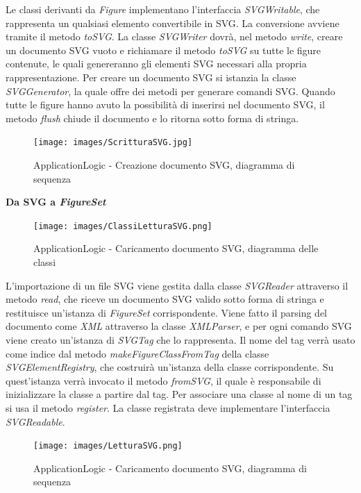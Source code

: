 Le classi derivanti da \textit{Figure} implementano l'interfaccia \textit{SVGWritable}, che rappresenta un qualsiasi elemento convertibile in SVG. La conversione avviene tramite il metodo \textit{toSVG}. La classe \textit{SVGWriter} dovr\`a, nel metodo \textit{write}, creare un documento SVG vuoto e richiamare il metodo \textit{toSVG} su tutte le figure contenute, le quali genereranno gli elementi SVG necessari alla propria rappresentazione. Per creare un documento SVG si istanzia la classe \textit{SVGGenerator}, la quale offre dei metodi per generare comandi SVG. Quando tutte le figure hanno avuto la possibilit\`a di inserirsi nel documento SVG, il metodo \textit{flush} chiude il documento e lo ritorna sotto forma di stringa.
\newpage
\begin{figure}[!ht]
\centering
\texttt{[image: images/ScritturaSVG.jpg]}
\caption{ApplicationLogic - Creazione documento SVG, diagramma di sequenza}
\end{figure}

\newpage
\textbf{Da SVG a \textit{FigureSet}}

\begin{figure}[!ht]
\centering
\texttt{[image: images/ClassiLetturaSVG.png]}
\caption{ApplicationLogic - Caricamento documento SVG, diagramma delle classi}
\end{figure}

L'importazione di un file SVG viene gestita dalla classe \textit{SVGReader} attraverso il metodo \textit{read}, che riceve un documento SVG valido sotto forma di stringa e restituisce un'istanza di \textit{FigureSet} corrispondente. Viene fatto il parsing del documento come \textit{XML} attraverso la classe \textit{XMLParser}, e per ogni comando SVG viene creato un'istanza di \textit{SVGTag} che lo rappresenta. Il nome del tag verr\`a usato come indice dal metodo \textit{makeFigureClassFromTag} della classe \textit{SVGElementRegistry}, che costruir\`a un'istanza della classe corrispondente. Su quest'istanza verr\`a invocato il metodo \textit{fromSVG}, il quale \`e responsabile di inizializzare la classe a partire dal tag. Per associare una classe al nome di un tag si usa il metodo \textit{register}. La classe registrata deve implementare l'interfaccia \textit{SVGReadable}.


\begin{figure}[!ht]
\centering
\texttt{[image: images/LetturaSVG.png]}
\caption{ApplicationLogic - Caricamento documento SVG, diagramma di sequenza}
\end{figure}





